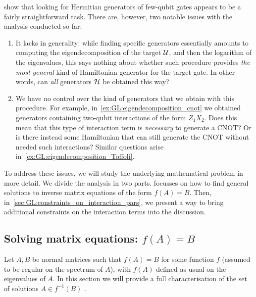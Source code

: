  show that looking for Hermitian generators of few-qubit gates appears to be a fairly straightforward task. There are, however, two notable issues with the analysis conducted so far:
\begin{enumerate}
    \item It lacks in generality: while finding specific generators essentially amounts to computing the eigendecomposition of the target ${\mathcal{U}}$, and then the logarithm of the eigenvalues, this says nothing about whether such procedure provides \emph{the most general} kind of Hamiltonian generator for the target gate. In other words, can \textit{all} generators ${\mathcal{H}}$ be obtained this way?
    \item We have no control over the kind of generators that we obtain with this procedure. For example, in~\cref{ex:GL:eigendecomposition_cnot} we obtained generators containing two-qubit interactions of the form $Z_1 X_2$. Does this mean that this type of interaction term is \textit{necessary} to generate a CNOT? Or is there instead some Hamiltonian that can still generate the CNOT without needed such interactions?
    Similar questions arise in~\cref{ex:GL:eigendecomposition_Toffoli}.
\end{enumerate}

To address these issues, we will study the underlying mathematical problem in more detail.
We divide the analysis in two parts.  focusses on how to find general solutions to inverse matrix equations of the form $f(A)=B$. Then, in~\cref{sec:GL:constraints_on_interaction_pars}, we present a way to bring additional constraints on the interaction terms into the discussion.

\subsection{Solving matrix equations: \texorpdfstring{$f(A)=B$}{f(A)=B}}
\label{sec:GL:solutions_matrix_equation_f(A)=B}

Let $A,B$ be normal matrices such that $f(A)=B$ for some function $f$ (assumed to be regular on the spectrum of $A$), with $f(A)$ defined as usual on the eigenvalues of $A$.
In this section we will provide a full characterisation of the set of solutions $A\in f^{-1}(B)$ .

